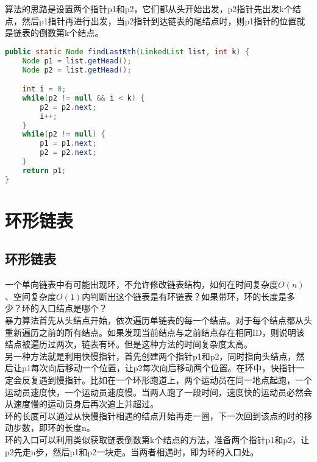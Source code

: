 算法的思路是设置两个指针p1和p2，它们都从头开始出发，p2指针先出发k个结点，然后p1指针再进行出发，当p2指针到达链表的尾结点时，则p1指针的位置就是链表的倒数第k个结点。 \\


\begin{lstlisting}[language=Java]
public static Node findLastKth(LinkedList list, int k) {
    Node p1 = list.getHead();
    Node p2 = list.getHead();

    int i = 0;
    while(p2 != null && i < k) {
        p2 = p2.next;
        i++;
    }
    while(p2 != null) {
        p1 = p1.next;
        p2 = p2.next;
    }
    return p1;
}
\end{lstlisting}

\newpage

\section{环形链表}

\subsection{环形链表}

一个单向链表中有可能出现环，不允许修改链表结构，如何在时间复杂度$ O(n) $、空间复杂度$ O(1) $内判断出这个链表是有环链表？如果带环，环的长度是多少？环的入口结点是哪个？ \\

暴力算法首先从头结点开始，依次遍历单链表的每一个结点。对于每个结点都从头重新遍历之前的所有结点。如果发现当前结点与之前结点存在相同ID，则说明该结点被遍历过两次，链表有环。但是这种方法的时间复杂度太高。 \\

另一种方法就是利用快慢指针，首先创建两个指针p1和p2，同时指向头结点，然后让p1每次向后移动一个位置，让p2每次向后移动两个位置。在环中，快指针一定会反复遇到慢指针。比如在一个环形跑道上，两个运动员在同一地点起跑，一个运动员速度快，一个运动员速度慢。当两人跑了一段时间，速度快的运动员必然会从速度慢的运动员身后再次追上并超过。 \\

环的长度可以通过从快慢指针相遇的结点开始再走一圈，下一次回到该点的时的移动步数，即环的长度n。 \\

环的入口可以利用类似获取链表倒数第k个结点的方法，准备两个指针p1和p2，让p2先走n步，然后p1和p2一块走。当两者相遇时，即为环的入口处。 \\

